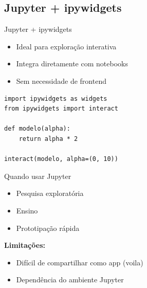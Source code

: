 \documentclass{beamer}
\begin{document}
\subsection{Jupyter + ipywidgets}

\begin{frame}[fragile]{Jupyter + ipywidgets}
\begin{itemize}
    \item Ideal para exploração interativa
    \item Integra diretamente com notebooks
    \item Sem necessidade de frontend
\end{itemize}

\begin{verbatim}
import ipywidgets as widgets
from ipywidgets import interact

def modelo(alpha):
    return alpha * 2

interact(modelo, alpha=(0, 10))
\end{verbatim}

\end{frame}

\begin{frame}{Quando usar Jupyter}
\begin{itemize}
    \item Pesquisa exploratória
    \item Ensino
    \item Prototipação rápida
\end{itemize}

\vspace{0.3cm}

\textbf{Limitações:}
\begin{itemize}
    \item Difícil de compartilhar como app (voila)
    \item Dependência do ambiente Jupyter
\end{itemize}
\end{frame}
\end{document}
